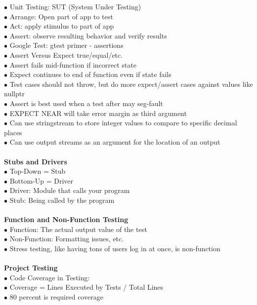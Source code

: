 \documentclass[11pt]{article}
\begin{document}
\indent\indent $\bullet$ Unit Testing: SUT (System Under Testing)\\
\indent\indent\indent  $\bullet$ Arrange: Open part of app to test\\ 
\indent\indent\indent  $\bullet$ Act: apply stimulus to part of app \\
\indent\indent\indent  $\bullet$ Assert: observe resulting behavior and verify results  \\
\indent\indent $\bullet$ Google Test: gtest primer - assertions \\
\indent\indent $\bullet$ Assert Versus Expect true/equal/etc. \\
\indent\indent\indent $\bullet$ Assert fails mid-function if incorrect state \\
\indent\indent\indent $\bullet$ Expect continues to end of function even if state fails \\
\indent\indent $\bullet$ Test cases should not throw, but do more expect/assert cases against values like nullptr \\
\indent\indent $\bullet$ Assert is best used when a test after may seg-fault \\
\indent\indent $\bullet$ EXPECT NEAR will take error margin as third argument \\
\indent\indent $\bullet$ Can use stringstream to store integer values to compare to specific decimal places \\
\indent\indent\indent $\bullet$ Can use output streams as an argument for the location of an output \\
\\
\textbf{Stubs and Drivers}\\
\indent $\bullet$ Top-Down = Stub\\
\indent $\bullet$ Bottom-Up = Driver \\
\indent $\bullet$ Driver: Module that calls your program\\
\indent $\bullet$ Stub: Being called by the program\\
\\
\textbf{Function and Non-Function Testing}\\
\indent $\bullet$ Function: The actual output value of the test\\
\indent $\bullet$ Non-Function: Formatting issues, etc.\\
\indent $\bullet$ Stress testing, like having tons of users log in at once, is non-function\\
\\
\textbf{Project Testing}\\
\indent $\bullet$ Code Coverage in Testing:\\
\indent $\bullet$ Coverage = Lines Executed by Tests / Total Lines\\
\indent $\bullet$ 80 percent is required coverage \\






    
\end{document}
